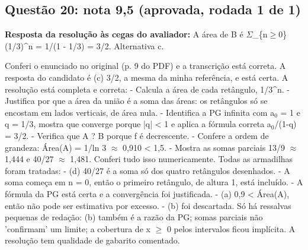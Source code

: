 \documentclass{article}%
\begin{document}
\subsection*{Questão 20: nota 9,5 (aprovada, rodada 1 de 1)}%
\textbf{Resposta da resolução às cegas do avaliador:} A área de B é $\Sigma$\_\{n$\geq$0\} (1/3)\^{}n = 1/(1 - 1/3) = 3/2. Alternativa c.\par %
Conferi o enunciado no original (p. 9 do PDF) e a transcrição está correta. A resposta do candidato é (c) 3/2, a mesma da minha referência, e está certa.\newline%
\newline%
A resolução está completa e correta:\newline%
{-} Calcula a área de cada retângulo, 1/3\^{}n.\newline%
{-} Justifica por que a área da união é a soma das áreas: os retângulos só se encostam em lados verticais, de área nula.\newline%
{-} Identifica a PG infinita com a$_{0}$ = 1 e q = 1/3, mostra que converge porque |q| < 1 e aplica a fórmula correta a$_{0}$/(1-q) = 3/2.\newline%
{-} Verifica que A ? B porque f é decrescente.\newline%
{-} Confere a ordem de grandeza: Área(A) = 1/ln 3 $\approx$ 0,910 < 1,5.\newline%
{-} Mostra as somas parciais 13/9 $\approx$ 1,444 e 40/27 $\approx$ 1,481. Conferi tudo isso numericamente.\newline%
\newline%
Todas as armadilhas foram tratadas:\newline%
{-} (d) 40/27 é a soma só dos quatro retângulos desenhados.\newline%
{-} A soma começa em n = 0, então o primeiro retângulo, de altura 1, está incluído.\newline%
{-} A fórmula da PG está certa e a convergência foi justificada.\newline%
{-} (a) 0,9 < Área(A), então não pode ser estimativa por excesso.\newline%
{-} (b) foi descartada.\newline%
\newline%
Só há ressalvas pequenas de redação: (b) também é a razão da PG; somas parciais não 'confirmam' um limite; a cobertura de x $\geq$ 0 pelos intervalos ficou implícita. A resolução tem qualidade de gabarito comentado.%
\end{document}
